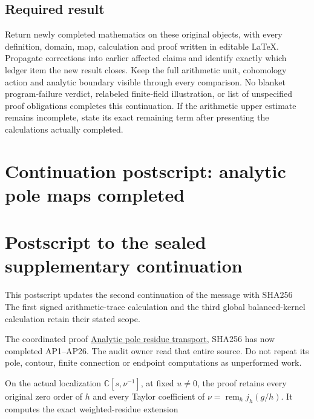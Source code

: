 \subsection{Required result}\label{TranscriptLedgerStage:required-result}

Return newly completed mathematics on these original objects, with every
definition, domain, map, calculation and proof written in editable
LaTeX. Propagate corrections into earlier affected claims and identify
exactly which ledger item the new result closes. Keep the full
arithmetic unit, cohomology action and analytic boundary visible through
every comparison. No blanket program-failure verdict, relabeled
finite-field illustration, or list of unspecified proof obligations
completes this continuation. If the arithmetic upper estimate remains
incomplete, state its exact remaining term after presenting the
calculations actually completed.

\clearpage

\section{Continuation postscript: analytic pole maps
completed}\label{TranscriptLedgerStage:continuation-postscript-analytic-pole-maps-completed}

\section{Postscript to the sealed supplementary
continuation}\label{TranscriptLedgerStage:postscript-to-the-sealed-supplementary-continuation}

This postscript updates the second continuation of the message with
SHA256
\protect{}
The first signed arithmetic-trace calculation and the third global
balanced-kernel calculation retain their stated scope.

The coordinated proof
\href{dependencies/remote/f1_unit_gauge/ANALYTIC_POLE_RESIDUE_TRANSPORT.md}{Analytic
pole residue transport}, SHA256
\protect{}
has now completed AP1--AP26. The audit owner read that entire source. Do
not repeat its pole, contour, finite connection or endpoint computations
as unperformed work.

On the actual localization \(\mathbb C[s,\nu^{-1}]\), at fixed
\(u\ne0\), the proof retains every original zero order of \(h\) and
every Taylor coefficient of \(\nu=\operatorname{rem}_h j_h(g/h)\). It
computes the exact weighted-residue extension

